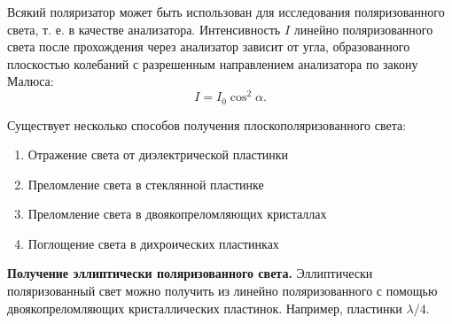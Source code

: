 \documentclass[a4paper,12pt]{article} %
\begin{document}
	Всякий поляризатор может быть использован для исследования поляризованного света, т. е. в качестве анализатора. Интенсивность $I$ линейно поляризованного света после прохождения через анализатор зависит от угла, образованного плоскостью колебаний с разрешенным направлением анализатора по закону Малюса:
	\begin{equation*}
		I = I_0 \cos^2\alpha.
	\end{equation*}


	Существует несколько способов получения плоскополяризованного света:
	\begin{enumerate}
		\item Отражение света от диэлектрической пластинки
		
		\item Преломление света в стеклянной пластинке
		
		\item Преломление света в двоякопреломляющих кристаллах
		
		\item Поглощение света в дихроических пластинках
	\end{enumerate}
	
	
	\textbf{Получение эллиптически поляризованного света.} Эллиптически поляризованный свет можно получить из линейно поляризованного с помощью двоякопреломляющих кристаллических пластинок. Например, пластинки $\lambda / 4$.
\end{document}
